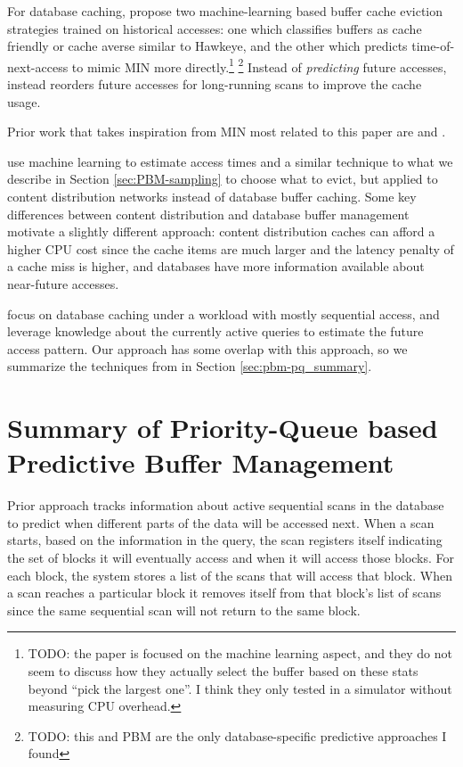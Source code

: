 


For database caching, \citet{yuan2022learned} propose two machine-learning based buffer cache eviction strategies trained on historical accesses: one which classifies buffers as cache friendly or cache averse similar to Hawkeye, and the other which predicts time-of-next-access to mimic MIN more directly.\footnote{TODO: the paper is focused on the machine learning aspect, and they do not seem to discuss how they actually select the buffer based on these stats beyond ``pick the largest one''. I think they only tested in a simulator without measuring CPU overhead.} \footnote{TODO: this and PBM are the only database-specific predictive approaches I found} Instead of \textit{predicting} future accesses, \cite{coopScans} instead reorders future accesses for long-running scans to improve the cache usage.

Prior work that takes inspiration from MIN most related to this paper are \cite{relaxedBelady} and \cite{pbm}. 

\citet{relaxedBelady} use machine learning to estimate access times and a similar technique to what we describe in Section \ref{sec:PBM-sampling} to choose what to evict, but applied to content distribution networks instead of database buffer caching. Some key differences between content distribution and database buffer management motivate a slightly different approach: content distribution caches can afford a higher CPU cost since the cache items are much larger and the latency penalty of a cache miss is higher, and databases have more information available about near-future accesses.

\citet{pbm} focus on database caching under a workload with mostly sequential access, and leverage knowledge about the currently active queries to estimate the future access pattern. Our approach has some overlap with this approach, so we summarize the techniques from \cite{pbm} in Section \ref{sec:pbm-pq_summary}.

\section{Summary of Priority-Queue based Predictive Buffer Management\label{sec:pbm-pq_summary}}

Prior approach \cite{pbm} tracks information about active sequential scans in the database to predict when different parts of the data will be accessed next.
When a scan starts, based on the information in the query, the scan registers itself indicating the set of blocks it will eventually access and when it will access those blocks. For each block, the system stores a list of the scans that will access that block. When a scan reaches a particular block it removes itself from that block's list of scans since the same sequential scan will not return to the same block.

